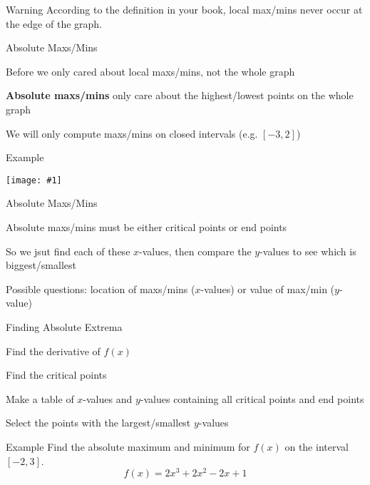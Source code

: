 \documentclass[t]{beamer}
\newenvironment{fpi}
  {\itemize[nolistsep,itemsep=\fill]}
  {\vfill\enditemize}
\newcommand{\img}[1]{
\vfill
\texttt{[image: \#1]}
\vfill
}
\begin{document}
\begin{frame}{Warning}
According to the definition in your book, local max/mins never occur at
the edge of the graph.
\end{frame}

\begin{frame}{Absolute Maxs/Mins}
\begin{fpi}
\item Before we only cared about local maxs/mins, not the whole graph
\item \textbf{Absolute maxs/mins} only care about the highest/lowest points
on the whole graph
\item We will only compute maxs/mins on closed intervals (e.g. $[-3,2]$)
\end{fpi}
\end{frame}

\begin{frame}{Example}
\img{absolute}
\end{frame}

\begin{frame}{Absolute Maxs/Mins}
\begin{fpi}
\item Absolute maxs/mins must be either critical 
points or end points
\item So we jsut find each of these $x$-values, then 
compare the $y$-values to see which is biggest/smallest
\item Possible questions: location of maxs/mins 
($x$-values) or value of max/min ($y$-value)
\end{fpi}
\end{frame}

\begin{frame}{Finding Absolute Extrema}
\begin{fpi}
\item Find the derivative of $f(x)$
\item Find the critical points
\item Make a table of $x$-values and $y$-values 
containing all critical points and end points
\item Select the points with the largest/smallest
$y$-values
\end{fpi}
\end{frame}

\begin{frame}{Example}
Find the absolute maximum and minimum for
$f(x)$ on the interval $[-2,3]$.
$$f(x) = 2x^3 + 2x^2 -2x + 1$$
\end{frame}
\end{document}
